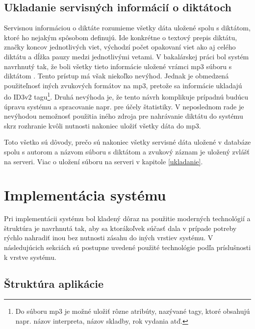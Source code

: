 \documentclass[12pt,oneside]{fithesis2}
\begin{document}
	\section{Ukladanie servisných informácií o diktátoch}
	\par Servisnou informáciou o diktáte rozumieme všetky dáta uložené spolu s diktátom, ktoré ho nejakým spôsobom definujú. Ide konkrétne o textový prepis diktátu, značky koncov jednotlivých viet, východzí počet opakovaní viet ako aj celého diktátu a dĺžka pauzy medzi jednotlivými vetami. V bakalárskej práci bol systém navrhnutý tak, že boli všetky tieto informácie uložené vrámci mp3 súboru s diktátom \cite{rumanov12}. Tento prístup má však niekoľko nevýhod. Jednak je obmedzená použiteľnosť iných zvukových formátov na mp3, pretože sa informácie ukladajú do ID3v2 tagu\footnote{Do súboru mp3 je možné uložiť rôzne atribúty, nazývané tagy, ktoré obsahujú napr. názov interpreta, názov skladby, rok vydania atď.}. Druhá nevýhoda je, že tento návrh komplikuje prípadnú budúcu úpravu systému a spracovanie napr. pre účely štatistiky. V neposlednom rade je nevýhodou nemožnosť použitia iného zdroja pre nahrávanie diktátu do systému skrz rozhranie kvôli nutnosti nakoniec uložiť všetky dáta do mp3.
	\par Toto všetko sú dôvody, prečo sú nakoniec všetky servisné dáta uložené v databáze spolu s autorom a názvom súboru s diktátom a zvukový záznam je uložený zvlášť na serveri. Viac o uložení súboru na serveri v kapitole \ref{ukladanie}.
	
    \chapter{Implementácia systému}
    
    \par Pri implementácii systému bol kladený dôraz na použitie moderných technológií a štruktúra je navrhnutá tak, aby sa ktorákoľvek súčasť dala v prípade potreby rýchlo nahradiť inou bez nutnosti zásahu do iných vrstiev systému. V následujúcich sekciách sú postupne uvedené použité technológie podľa príslušnosti k vrstve systému.
    
      \section{Štruktúra aplikácie}
\end{document}
